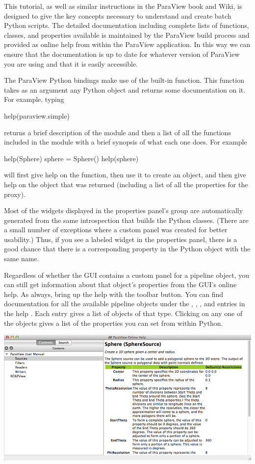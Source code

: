 This tutorial, as well as similar instructions in the ParaView book and
Wiki, is designed to give the key concepts necessary to understand and
create batch Python scripts.  The detailed documentation including complete lists of
functions, classes, and properties available is maintained by the ParaView
build process and provided as online help from within the ParaView
application.  In this way we can ensure that the documentation is up to
date for whatever version of ParaView you are using and that it is easily
accessible.

The ParaView Python bindings make use of the  built-in
function.  This function takes as an argument any Python object and returns
some documentation on it.  For example, typing
\begin{python}
  help(paraview.simple)
\end{python}
returns a brief description of the module and then a list of all the
functions included in the module with a brief synopsis of what each one
does.  For example
\begin{python}
  help(Sphere)
  sphere = Sphere()
  help(sphere)
\end{python}
will first give help on the  function, then use it to create
an object, and then give help on the object that was returned (including a
list of all the properties for the proxy).

Most of the widgets displayed in the properties panel's  group
are automatically generated from the same introspection that builds the
Python classes. (There are a small number of exceptions where a custom
panel was created for better usability.) Thus, if you see a labeled widget
in the properties panel, there is a good chance that there is a
corresponding property in the Python object with the same name.

Regardless of whether the GUI contains a custom panel for a pipeline
object, you can still get information about that object's properties from
the GUI's online help.  As always, bring up the help with the
 toolbar button.  You can find documentation for all the
available pipeline objects under the , ,
, and  entries in the help .  Each
entry gives a list of objects of that type.  Clicking on any one of the
objects gives a list of the properties you can set from within Python.

\begin{inlinefig}
  \includegraphics[width=\scw]{images/ObjectHelp}
\end{inlinefig}



